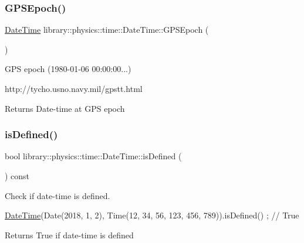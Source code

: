 \subsubsection{\texorpdfstring{G\+P\+S\+Epoch()}{GPSEpoch()}}
{\footnotesize\ttfamily \hyperlink{classlibrary_1_1physics_1_1time_1_1_date_time}{Date\+Time} library\+::physics\+::time\+::\+Date\+Time\+::\+G\+P\+S\+Epoch (\begin{DoxyParamCaption}{ }\end{DoxyParamCaption})\hspace{0.3cm}{\ttfamily [static]}}



G\+PS epoch (1980-\/01-\/06 00\+:00\+:00...) 

http\+://tycho.usno.\+navy.\+mil/gpstt.html

\begin{DoxyReturn}{Returns}
Date-\/time at G\+PS epoch 
\end{DoxyReturn}
\mbox{\label{classlibrary_1_1physics_1_1time_1_1_date_time_ae5726d0e5fd67f24af7b4fe66efd8a1f}} 
\subsubsection{\texorpdfstring{is\+Defined()}{isDefined()}}
{\footnotesize\ttfamily bool library\+::physics\+::time\+::\+Date\+Time\+::is\+Defined (\begin{DoxyParamCaption}{ }\end{DoxyParamCaption}) const}



Check if date-\/time is defined. 


\begin{DoxyCode}
\hyperlink{classlibrary_1_1physics_1_1time_1_1_date_time_a4ea629e533f335c928e037c4ead4646e}{DateTime}(Date(2018, 1, 2), Time(12, 34, 56, 123, 456, 789)).isDefined() ; \textcolor{comment}{// True}
\end{DoxyCode}


\begin{DoxyReturn}{Returns}
True if date-\/time is defined 
\end{DoxyReturn}
\mbox{\label{classlibrary_1_1physics_1_1time_1_1_date_time_a90b9490e08878d84d703fa9ae11cded7}} 
